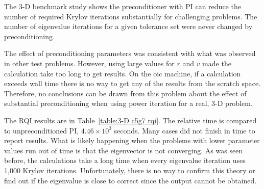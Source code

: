 The 3-D benchmark study shows the preconditioner with PI can reduce the number of required Krylov iterations substantially for challenging problems. The number of eigenvalue iterations for a given tolerance set were never changed by preconditioning. 

The effect of preconditioning parameters was consistent with what was observed in other test problems. However, using large values for $r$ and $v$ made the calculation take too long to get results. On the oic machine, if a calculation exceeds wall time there is no way to get any of the results from the scratch space. Therefore, no conclusions can be drawn from this problem about the effect of substantial preconditioning when using power iteration for a real, 3-D problem. 

The RQI results are in Table~\ref{table:3-D c5g7 rqi}. The relative time is compared to unpreconditioned PI, $4.46 \times 10^{3}$ seconds. Many cases did not finish in time to report results. What is likely happening when the problems with lower parameter values run out of time is that the eigenvector is not converging. As was seen before, the calculations take a long time when every eigenvalue iteration uses 1,000 Krylov iterations. Unfortunately, there is no way to confirm this theory or find out if the eigenvalue is close to correct since the output cannot be obtained. 
%
